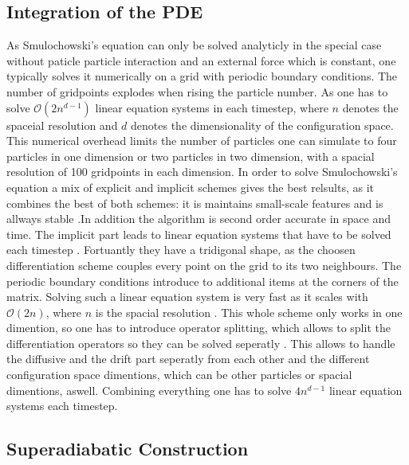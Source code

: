 \documentclass[a4paper]{article}
\begin{document}
\subsection{Integration of the PDE}
As Smulochowski's equation can only be solved analyticly in the special case without paticle particle interaction and an external force which is constant, one typically solves it numerically on a grid with periodic boundary conditions. The number of gridpoints explodes when rising the particle number. As one has to solve $\mathcal{O}(2n^{d-1})$ linear equation systems in each timestep, where $n$ denotes the spaceial resolution and $d$ denotes the dimensionality of the configuration space. This numerical overhead limits the number of particles one can simulate to four particles in one dimension or two particles in two dimension, with a spacial resolution of 100 gridpoints in each dimension. In order to solve Smulochowski's equation a mix of explicit and implicit schemes gives the best relsults, as it combines the best of both schemes: it is maintains small-scale features and is allways stable \cite{numericalRecepies}.In addition the algorithm is second order accurate in space and time. The implicit part leads to linear equation systems that have to be solved each timestep \cite{tobi}. Fortuantly they have a tridigonal shape, as the choosen differentiation scheme couples every point on the grid to its two neighbours. The periodic boundary conditions introduce to additional items at the corners of the matrix. Solving such a linear equation system is very fast as it scales with  $\mathcal{O}(2n)$, where $n$ is the spacial resolution \cite{numericalRecepies}. This whole scheme only works in one dimention, so one has to introduce operator splitting, which allows to split the differentiation operators so they can be solved seperatly \cite{numericalRecepies}. This allows to handle the diffusive and the drift part seperatly from each other and the different configuration space dimentions, which can be other particles or spacial dimentions, aswell. Combining everything one has to solve $4n^{d-1}$ linear equation systems each timestep. 
\subsection{Superadiabatic Construction}
\end{document}
